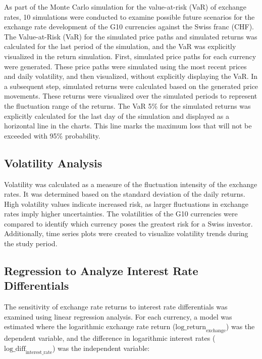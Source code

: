 \documentclass{article}
\begin{document}
As part of the Monte Carlo simulation for the value-at-risk (VaR) of exchange rates, 10 simulations were conducted to examine possible future scenarios for the exchange rate development of the G10 currencies against the Swiss franc (CHF). The Value-at-Risk (VaR) for the simulated price paths and simulated returns was calculated for the last period of the simulation, and the VaR was explicitly visualized in the return simulation.
First, simulated price paths for each currency were generated. These price paths were simulated using the most recent prices and daily volatility, and then visualized, without explicitly displaying the VaR.
In a subsequent step, simulated returns were calculated based on the generated price movements. These returns were visualized over the simulated periods to represent the fluctuation range of the returns. The VaR 5\% for the simulated returns was explicitly calculated for the last day of the simulation and displayed as a horizontal line in the charts. This line marks the maximum loss that will not be exceeded with 95\% probability.

\subsection{Volatility Analysis}

Volatility was calculated as a measure of the fluctuation intensity of the exchange rates. It was determined based on the standard deviation of the daily returns. High volatility values indicate increased risk, as larger fluctuations in exchange rates imply higher uncertainties. The volatilities of the G10 currencies were compared to identify which currency poses the greatest risk for a Swiss investor. Additionally, time series plots were created to visualize volatility trends during the study period.

\subsection{Regression to Analyze Interest Rate Differentials}

The sensitivity of exchange rate returns to interest rate differentials was examined using linear regression analysis. For each currency, a model was estimated where the logarithmic exchange rate return (\(\text{log\_return}_{\text{exchange}}\)) was the dependent variable, and the difference in logarithmic interest rates (\(\text{log\_diff}_{\text{interest\_rate}}\)) was the independent variable:
\end{document}
